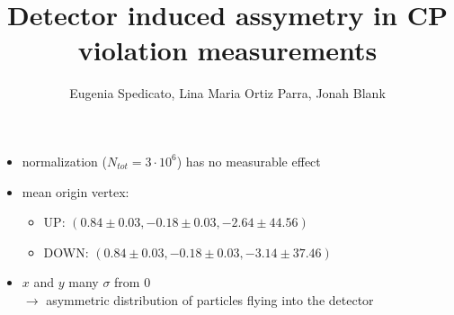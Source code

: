 \documentclass[11pt]{beamer}
\author{Eugenia Spedicato, Lina Maria Ortiz Parra, Jonah Blank}
\title{Detector induced assymetry in CP violation measurements}
\begin{document}
\begin{frame}
\titlepage
\end{frame}

\begin{frame}
\begin{itemize}
\item normalization ($N_{tot}=3\cdot 10^{6}$) has no measurable effect
\item mean origin vertex:\begin{itemize}
\item UP: $(0.84\pm 0.03, -0.18\pm 0.03, -2.64 \pm 44.56)$
\item DOWN: $(0.84\pm 0.03, -0.18\pm 0.03, -3.14 \pm 37.46)$
\end{itemize}
\item $x$ and $y$ many $\sigma$ from $0$\\
$\rightarrow$ asymmetric distribution of particles flying into the detector
\end{itemize}
\end{frame}
\end{document}

